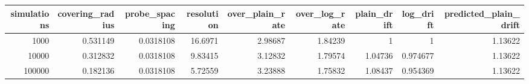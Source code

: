 \begin{tabular}{rrrrrrrrr}
\toprule
simulations & covering_radius & probe_spacing & resolution & over_plain_rate & over_log_rate & plain_drift & log_drift & predicted_plain_drift \\
\midrule
1000 & 0.531149 & 0.0318108 & 16.6971 & 2.98687 & 1.84239 & 1 & 1 & 1.13622 \\
10000 & 0.312832 & 0.0318108 & 9.83415 & 3.12832 & 1.79574 & 1.04736 & 0.974677 & 1.13622 \\
100000 & 0.182136 & 0.0318108 & 5.72559 & 3.23888 & 1.75832 & 1.08437 & 0.954369 & 1.13622 \\
\bottomrule
\end{tabular}
